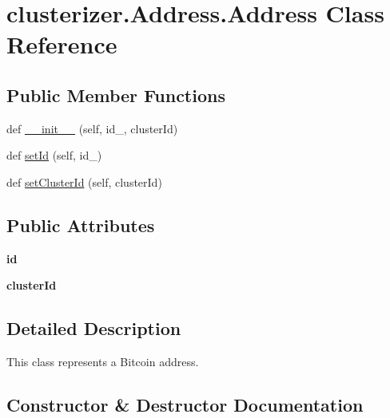 \hypertarget{classclusterizer_1_1Address_1_1Address}{}\section{clusterizer.\+Address.\+Address Class Reference}
\label{classclusterizer_1_1Address_1_1Address}
\subsection*{Public Member Functions}
\begin{DoxyCompactItemize}
\item 
def \hyperlink{classclusterizer_1_1Address_1_1Address_a44c2e7cd57afadd4ef209b969187f249}{\+\_\+\+\_\+init\+\_\+\+\_\+} (self, id\+\_\+, cluster\+Id)
\item 
def \hyperlink{classclusterizer_1_1Address_1_1Address_af1ec979f1d6e76722498bdb5b495567a}{set\+Id} (self, id\+\_\+)
\item 
def \hyperlink{classclusterizer_1_1Address_1_1Address_a14b16fa21a0bd8c0130d69567371a66d}{set\+Cluster\+Id} (self, cluster\+Id)
\end{DoxyCompactItemize}
\subsection*{Public Attributes}
\begin{DoxyCompactItemize}
\item 
\hypertarget{classclusterizer_1_1Address_1_1Address_a225fd282087e0e790f8825803b9605ca}{}{\bfseries id}\label{classclusterizer_1_1Address_1_1Address_a225fd282087e0e790f8825803b9605ca}

\item 
\hypertarget{classclusterizer_1_1Address_1_1Address_aa85cce39b072df35708abbef0fd311c0}{}{\bfseries cluster\+Id}\label{classclusterizer_1_1Address_1_1Address_aa85cce39b072df35708abbef0fd311c0}

\end{DoxyCompactItemize}


\subsection{Detailed Description}
\begin{DoxyVerb}This class represents a Bitcoin address.\end{DoxyVerb}
 

\subsection{Constructor \& Destructor Documentation}
\hypertarget{classclusterizer_1_1Address_1_1Address_a44c2e7cd57afadd4ef209b969187f249}{}
